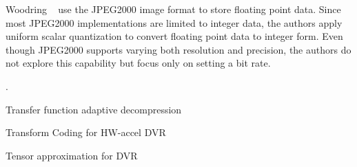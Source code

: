 
Woodring \etal~\cite{woodring2011} use the JPEG2000 image format to store floating point data.
Since most JPEG2000 implementations are limited to integer data, the authors apply uniform scalar
quantization to convert floating point data to integer form. Even though JPEG2000 supports varying
both resolution and precision, the authors do not explore this capability but focus only on setting
a bit rate.

.

Transfer function adaptive decompression~\cite{tf_decompression2004}

Transform Coding for HW-accel DVR~\cite{hw_dvr2007}

Tensor approximation for DVR~\cite{tensor_dvr2015}

